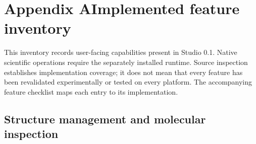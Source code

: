 \clearpage
\onecolumn
\section*{Appendix A\quad Implemented feature inventory}
\noindent This inventory records user-facing capabilities present in Studio 0.1. Native scientific operations require the separately installed runtime. Source inspection establishes implementation coverage; it does not mean that every feature has been revalidated experimentally or tested on every platform. The accompanying feature checklist maps each entry to its implementation.

\subsection*{Structure management and molecular inspection}
\begingroup
\small
\setlength{\tabcolsep}{7pt}
\renewcommand{\arraystretch}{1.18}
